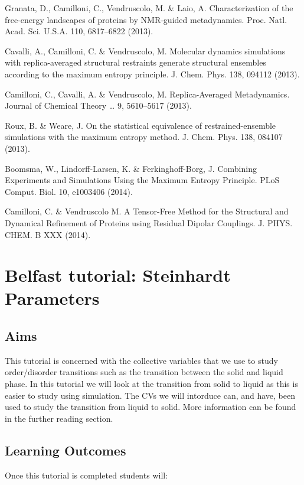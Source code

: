 \begin{DoxyEnumerate}
\item Granata, D., Camilloni, C., Vendruscolo, M. \& Laio, A. Characterization of the free-\/energy landscapes of proteins by N\+M\+R-\/guided metadynamics. Proc. Natl. Acad. Sci. U.\+S.\+A. 110, 6817–6822 (2013).
\item Cavalli, A., Camilloni, C. \& Vendruscolo, M. Molecular dynamics simulations with replica-\/averaged structural restraints generate structural ensembles according to the maximum entropy principle. J. Chem. Phys. 138, 094112 (2013).
\item Camilloni, C., Cavalli, A. \& Vendruscolo, M. Replica-\/\+Averaged Metadynamics. Journal of Chemical Theory … 9, 5610–5617 (2013).
\item Roux, B. \& Weare, J. On the statistical equivalence of restrained-\/ensemble simulations with the maximum entropy method. J. Chem. Phys. 138, 084107 (2013).
\item Boomsma, W., Lindorff-\/\+Larsen, K. \& Ferkinghoff-\/\+Borg, J. Combining Experiments and Simulations Using the Maximum Entropy Principle. P\+Lo\+S Comput. Biol. 10, e1003406 (2014).
\item Camilloni, C. \& Vendruscolo M. A Tensor-\/\+Free Method for the Structural and Dynamical Refinement of Proteins using Residual Dipolar Couplings. J. P\+H\+Y\+S. C\+H\+E\+M. B X\+X\+X (2014). 
\end{DoxyEnumerate}\hypertarget{belfast-10}{}\section{Belfast tutorial\+: Steinhardt Parameters}\label{belfast-10}
\hypertarget{belfast-10_Aims}{}\subsection{Aims}\label{belfast-10_Aims}
This tutorial is concerned with the collective variables that we use to study order/disorder transitions such as the transition between the solid and liquid phase. In this tutorial we will look at the transition from solid to liquid as this is easier to study using simulation. The C\+Vs we will intorduce can, and have, been used to study the transition from liquid to solid. More information can be found in the further reading section.\hypertarget{belfast-10_belfast-10-lo}{}\subsection{Learning Outcomes}\label{belfast-10_belfast-10-lo}
Once this tutorial is completed students will\+:


